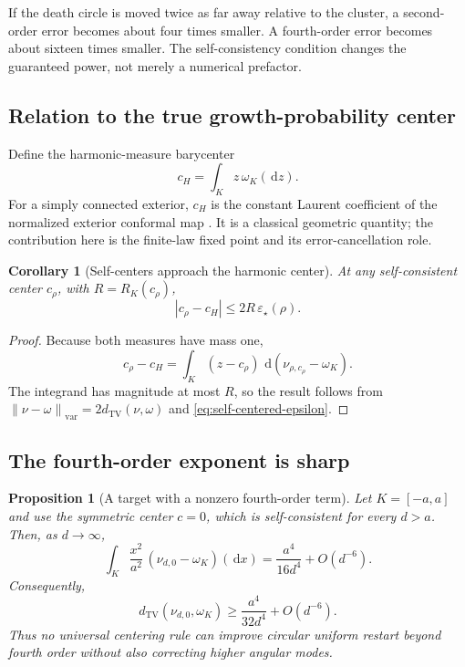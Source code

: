 \documentclass[11pt]{article}
\theoremstyle{mainthm}
\newtheorem{proposition}[proposition]{Proposition}
\newtheorem{corollary}[corollary]{Corollary}
\theoremstyle{definition}
\theoremstyle{remark}
\newcommand{\dd}{\,\mathrm d}
\newcommand{\dTV}{d_{\mathrm{TV}}}
\newcommand{\norm}[1]{\left\lVert #1\right\rVert}
\newcommand{\eps}{\varepsilon}
\begin{document}
\begin{plainbox}
If the death circle is moved twice as far away relative to the cluster, a second-order error becomes about four times smaller. A fourth-order error becomes about sixteen times smaller. The self-consistency condition changes the guaranteed power, not merely a numerical prefactor.
\end{plainbox}

\subsection{Relation to the true growth-probability center}

Define the harmonic-measure barycenter
\[
  c_H=\int_K z\,\omega_K(\dd z).
\]
For a simply connected exterior, $c_H$ is the constant Laurent coefficient of the normalized exterior conformal map \cite{DavidovitchEtAl1999}. It is a classical geometric quantity; the contribution here is the finite-law fixed point and its error-cancellation role.

\begin{corollary}[Self-centers approach the harmonic center]
\label{cor:center-closeness}
At any self-consistent center $c_\rho$, with $R=R_K(c_\rho)$,
\[
  |c_\rho-c_H|
  \le 2R\,\eps_\star(\rho).
\]
\end{corollary}

\begin{proof}
Because both measures have mass one,
\[
  c_\rho-c_H
  =\int_K(z-c_\rho)\,\dd(\nu_{\rho,c_\rho}-\omega_K).
\]
The integrand has magnitude at most $R$, so the result follows from
$\norm{\nu-\omega}_{\mathrm{var}}=2\dTV(\nu,\omega)$ and \eqref{eq:self-centered-epsilon}.
\end{proof}

\subsection{The fourth-order exponent is sharp}

\begin{proposition}[A target with a nonzero fourth-order term]
\label{prop:sharpness}
Let $K=[-a,a]$ and use the symmetric center $c=0$, which is self-consistent for every $d>a$. Then, as $d\to\infty$,
\[
  \int_K\frac{x^2}{a^2}\,
  (\nu_{d,0}-\omega_K)(\dd x)
  =\frac{a^4}{16d^4}+O(d^{-6}).
\]
Consequently,
\[
  \dTV(\nu_{d,0},\omega_K)
  \ge\frac{a^4}{32d^4}+O(d^{-6}).
\]
Thus no universal centering rule can improve circular uniform restart beyond fourth order without also correcting higher angular modes.
\end{proposition}
\end{document}
